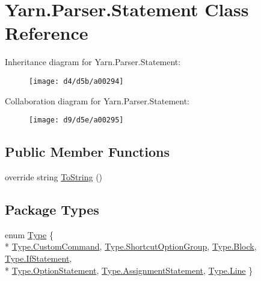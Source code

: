 \hypertarget{a00076}{\section{Yarn.\-Parser.\-Statement Class Reference}
\label{a00076}
}


Inheritance diagram for Yarn.\-Parser.\-Statement\-:
\nopagebreak
\begin{figure}[H]
\begin{center}
\leavevmode
\texttt{[image: d4/d5b/a00294]}
\end{center}
\end{figure}


Collaboration diagram for Yarn.\-Parser.\-Statement\-:
\nopagebreak
\begin{figure}[H]
\begin{center}
\leavevmode
\texttt{[image: d9/d5e/a00295]}
\end{center}
\end{figure}
\subsection*{Public Member Functions}
\begin{DoxyCompactItemize}
\item 
override string \hyperlink{a00063_a18c67cb16090d0889bb9d6c8c6c565f8}{To\-String} ()
\end{DoxyCompactItemize}
\subsection*{Package Types}
\begin{DoxyCompactItemize}
\item 
enum \hyperlink{a00076_a518000e4e6219ce5f9f4229f505cd944}{Type} \{ \\*
\hyperlink{a00076_a518000e4e6219ce5f9f4229f505cd944af6b081742758e5cbc3a2e679e521a4fe}{Type.\-Custom\-Command}, 
\hyperlink{a00076_a518000e4e6219ce5f9f4229f505cd944ae8a0b2e51320b69d57d378776ee0647a}{Type.\-Shortcut\-Option\-Group}, 
\hyperlink{a00076_a518000e4e6219ce5f9f4229f505cd944ae1e4c8c9ccd9fc39c391da4bcd093fb2}{Type.\-Block}, 
\hyperlink{a00076_a518000e4e6219ce5f9f4229f505cd944a69bf1eda358268e97a9d792c0e88b10d}{Type.\-If\-Statement}, 
\\*
\hyperlink{a00076_a518000e4e6219ce5f9f4229f505cd944a7e5b9e4625bac525ed765621cb074ef7}{Type.\-Option\-Statement}, 
\hyperlink{a00076_a518000e4e6219ce5f9f4229f505cd944a4ee9d26530a9c097d63b74d383c48341}{Type.\-Assignment\-Statement}, 
\hyperlink{a00076_a518000e4e6219ce5f9f4229f505cd944a4803e6b9e63dabf04de980788d6a13c4}{Type.\-Line}
 \}
\end{DoxyCompactItemize}
